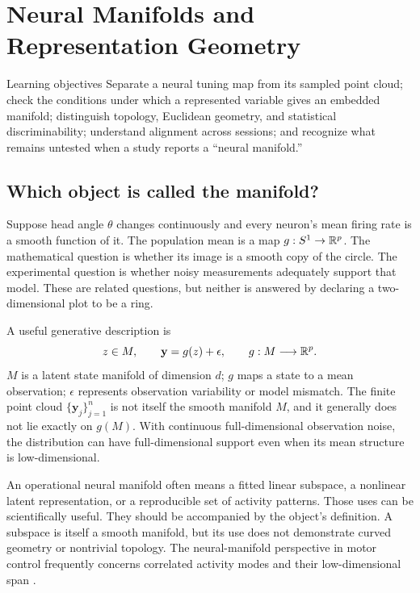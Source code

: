\chapter{Neural Manifolds and Representation Geometry}\label{ch:08}

\begin{insight}{Learning objectives}
Separate a neural tuning map from its sampled point cloud; check the conditions under which a represented variable gives an embedded manifold; distinguish topology, Euclidean geometry, and statistical discriminability; understand alignment across sessions; and recognize what remains untested when a study reports a ``neural manifold.''
\end{insight}

\section{Which object is called the manifold?}
Suppose head angle $\theta$ changes continuously and every neuron's mean firing rate is a smooth function of it. The population mean is a map $g:S^1\to\mathbb{R}^p$. The mathematical question is whether its image is a smooth copy of the circle. The experimental question is whether noisy measurements adequately support that model. These are related questions, but neither is answered by declaring a two-dimensional plot to be a ring.

A useful generative description is
\begin{equation}
 z\in M,\qquad \mathbf y=g(z)+\epsilon,\qquad
 g:M\longrightarrow\mathbb{R}^p.\label{eq:08-observation}
\end{equation}
$M$ is a latent state manifold of dimension $d$; $g$ maps a state to a mean observation; $\epsilon$ represents observation variability or model mismatch. The finite point cloud $\{\mathbf y_j\}_{j=1}^n$ is not itself the smooth manifold $M$, and it generally does not lie exactly on $g(M)$. With continuous full-dimensional observation noise, the distribution can have full-dimensional support even when its mean structure is low-dimensional.

An operational neural manifold often means a fitted linear subspace, a nonlinear latent representation, or a reproducible set of activity patterns. Those uses can be scientifically useful. They should be accompanied by the object's definition. A subspace is itself a smooth manifold, but its use does not demonstrate curved geometry or nontrivial topology. The neural-manifold perspective in motor control frequently concerns correlated activity modes and their low-dimensional span \citep{app_gallego2017}.

